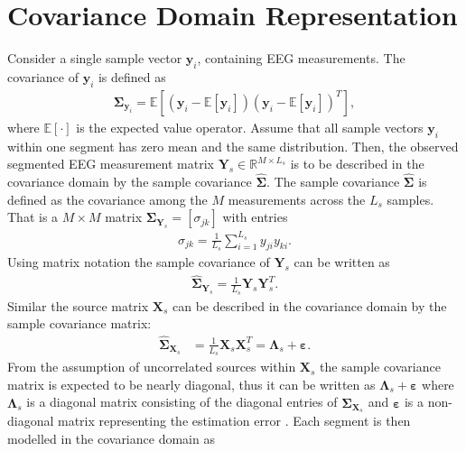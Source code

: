 \section{Covariance Domain Representation}\label{sec:cov}
Consider a single sample vector $\textbf{y}_i$, containing EEG measurements. 
The covariance of $\textbf{y}_i$ is defined as
\begin{align*}
\boldsymbol{\Sigma}_{\textbf{y}_i}=\mathbb{E}[(\textbf{y}_i-\mathbb{E}[\textbf{y}_i])(\textbf{y}_i-\mathbb{E}[\textbf{y}_i])^T],
\end{align*}
where $\mathbb{E}[\cdot]$ is the expected value operator. 
Assume that all sample vectors $\textbf{y}_i$ within one segment has zero mean and the same distribution. 
Then, the observed segmented EEG measurement matrix $\mathbf{Y}_s \in \mathbb{R}^{M \times L_s}$ is to be described in the covariance domain by the sample covariance $\widehat{\boldsymbol{\Sigma}}$. The sample covariance $\widehat{\boldsymbol{\Sigma}}$ is defined as the covariance among the $M$ measurements across the $L_s$ samples. That is a $M \times M$ matrix $\boldsymbol{\Sigma}_{\mathbf{Y}_s} = [\sigma_{jk}]$ with entries 
\begin{align*}
\sigma_{jk}= \frac{1}{L_s}\sum_{i=1}^{L_s} y_{ji} y_{ki}.
\end{align*}
Using matrix notation the sample covariance of $\mathbf{Y}_s$ can be written as
\begin{align*}
\widehat{\boldsymbol{\Sigma}}_{\mathbf{Y}_s} = \frac{1}{L_s} \mathbf{Y}_s \mathbf{Y}_s^T.
\end{align*} 
Similar the source matrix $\mathbf{X}_s$ can be described in the covariance domain by the sample covariance matrix:
\begin{align*}
\widehat{\boldsymbol{\Sigma}}_{\mathbf{X}_s} &= \frac{1}{L_s} \mathbf{X}_s \mathbf{X}_s^T = \boldsymbol{\Lambda}_s + \boldsymbol{\varepsilon}. 
\end{align*}
From the assumption of uncorrelated sources within $\mathbf{X}_s$ the sample covariance matrix is expected to be nearly diagonal, thus it can be written as $\boldsymbol{\Lambda}_s + \boldsymbol{\varepsilon}$ where $\boldsymbol{\Lambda}_s$ is a diagonal matrix consisting of the diagonal entries of $\widehat{\boldsymbol{\Sigma}}_{\mathbf{X}_s}$ and $ \boldsymbol{\varepsilon}$ is a non-diagonal matrix representing the estimation error \cite{Balkan2015}.
Each segment is then modelled in the covariance domain as
